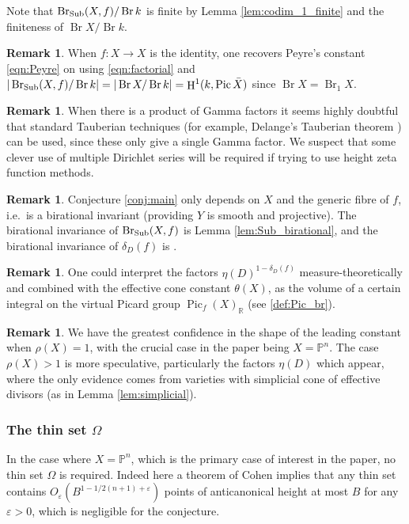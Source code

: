 \documentclass[a4paper,12pt,reqno]{amsart}
\numberwithin{equation}{section} \numberwithin{figure}{section}
\DeclareMathOperator{\Pic}{Pic} \DeclareMathOperator{\Div}{Div}
\DeclareMathOperator{\Br}{Br} \DeclareMathOperator{\Brnr}{Br_{nr}}
\DeclareMathOperator{\HH}{H}
\renewcommand\P{\mathbb{P}}
\newcommand\R{\mathbb{R}}
\renewcommand{\#}{\sharp}
\theoremstyle{definition}
\newtheorem{remark}[lemma]{Remark}
\numberwithin{lemma}{section}
\begin{document}
Note that  $\Sub(X,f)/\Br k$ is finite by Lemma \ref{lem:codim_1_finite} and the finiteness of $\Br X/\Br k$.

\begin{remark}
	When $f:X \to X$ is the identity, one recovers Peyre's constant \eqref{eqn:Peyre}
	on using \eqref{eqn:factorial} and 
	$|\Sub(X,f)/\Br k| = |\Br X/ \Br k| = \HH^1(k, \Pic \bar{X})$  since $\Br X = \Br_1 X$.
\end{remark}

\begin{remark}
	When there is a product of Gamma factors it seems highly doubtful that standard Tauberian techniques (for example, Delange's Tauberian theorem \cite{Del54}) can be used, since these only give a single Gamma factor. We suspect that some clever use of multiple Dirichlet series will be required if trying to use height zeta function methods.
\end{remark}

\begin{remark} \label{rem:birational_invariant}
	Conjecture \ref{conj:main} only depends on $X$ and the generic fibre of $f$,
	i.e.~is a birational invariant
	(providing $Y$ is smooth and projective). The birational
	invariance of $\operatorname{Br_{\mathrm{Sub}}}(X,f)$ is Lemma \ref{lem:Sub_birational}, and the birational
	invariance of $\delta_D(f)$ is \cite[Lem.~3.11]{LS16}.
\end{remark}


\begin{remark}
	One could interpret the factors $\eta(D)^{1- \delta_D(f)}$ measure-theoretically
	and  combined with the effective cone constant $\theta(X)$, as the volume of a certain
	integral on the virtual Picard group $\Pic_f(X)_\R$ (see \eqref{def:Pic_br}).
\end{remark}

\begin{remark}
	We have the greatest confidence in the shape of the leading constant
	when $\rho(X) = 1$, with the crucial case in the paper being $X = \P^n$. 
	The case $\rho(X)> 1$ is more speculative, particularly the factors
	$\eta(D)$ which appear, where the only evidence comes from varieties with simplicial cone
	of effective divisors (as in Lemma \ref{lem:simplicial}).
\end{remark}

\subsubsection{The thin set $\Omega$} \label{sec:thin_set}
In the case where $X = \P^n$, which is the primary case of interest in the paper, no thin set $\Omega$ is required. Indeed here a theorem of Cohen \cite[Thm.~13.3]{Ser97M} implies that any thin set contains $O_\varepsilon(B^{1 - 1/2(n+1) + \varepsilon})$ points of anticanonical height at most $B$ for any $\varepsilon > 0$, which is negligible for the conjecture.
\end{document}
